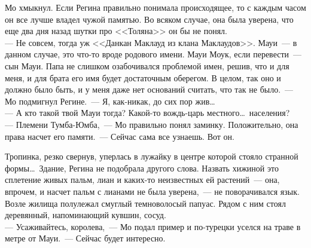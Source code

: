 Мо хмыкнул. Если Регина правильно понимала происходящее, то с каждым часом он 
все лучше владел чужой памятью. Во всяком случае, она была уверена, что еще два 
дня назад шутки про <<Толяна>> он бы не понял.\\
--- Не совсем, тогда уж <<Данкан Маклауд из клана Маклаудов>>. Мауи~--- в данном 
случае, это что-то вроде родового имени. Мауи Моук, если перевести~--- сын 
Мауи. Папа не слишком озабочивался проблемой имен, решив, что и для меня, и для брата 
его имя будет достаточным оберегом. В целом, так оно и должно было быть, и у 
меня даже нет оснований считать, что так не было.~--- Мо подмигнул Регине.~--- 
Я, как-никак, до сих пор жив\ldots\\
--- А кто такой твой Мауи тогда? Какой-то вождь-царь местного\ldots\ населения?\\
--- Племени Тумба-Юмба,~--- Мо правильно понял заминку. Положительно, она права 
насчет его памяти.~--- Сейчас сама все узнаешь. Вот он.

Тропинка, резко свернув, уперлась в лужайку в центре которой стояло странной 
формы\ldots\ Здание, Регина не подобрала другого слова. Назвать хижиной это 
сплетение живых пальм, лиан и каких-то неизвестных ей растений~--- она, 
впрочем, и насчет пальм с лианами не была уверена,~--- не поворачивался язык. Возле жилища 
полулежал смуглый темноволосый папуас. Рядом с ним стоял деревянный, 
напоминающий кувшин, сосуд.\\
--- Усаживайтесь, королева,~--- Мо подал пример и по-турецки уселся на траве в 
метре от Мауи.~--- Сейчас будет интересно.

